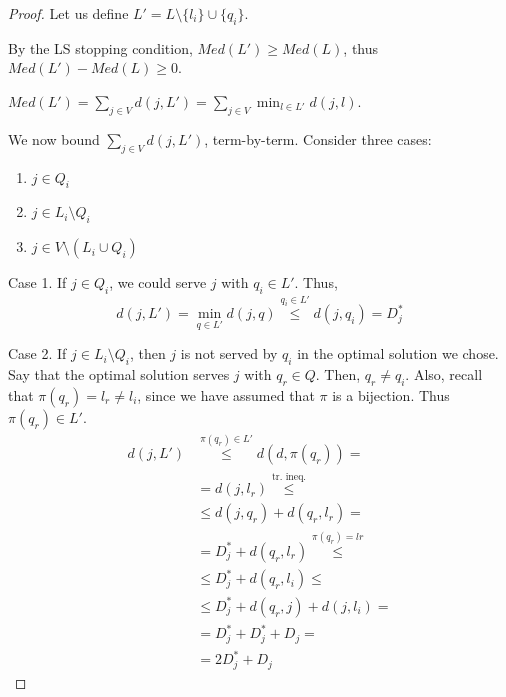     \begin{proof}
        Let us define $L' = L \setminus \{l_i\} \cup \{q_i\}$.

        By the LS stopping condition, $Med(L') \geq Med(L)$, thus $Med(L') - Med(L) \geq 0$.

        $Med(L') = \sum_{j \in V} d(j,L') = \sum_{j \in V} \min_{l \in L'} d(j,l)$.

        We now bound $\sum_{j \in V} d(j,L')$, term-by-term.
        Consider three cases:
        \begin{enumerate}
            \item $j \in Q_i$
            \item $j \in L_i \setminus Q_i$
            \item $j \in V \setminus (L_i \cup Q_i)$
        \end{enumerate}

        Case 1. If $j \in Q_i$, we could serve $j$ with $q_i \in L'$. Thus,
        \begin{equation*}
            d(j,L') = \min_{q \in L'} d(j,q) \overset{q_i \in L'}{\leq} d(j,q_i) = D_j^*
        \end{equation*}

        Case 2. If $j \in L_i \setminus Q_i$, then $j$ is not served by $q_i$ in the optimal solution we chose.
        Say that the optimal solution serves $j$ with $q_r \in Q$.
        Then, $q_r \neq q_i$. Also, recall that $\pi(q_r) = l_r \neq l_i$, since we have assumed that $\pi$ is a bijection. Thus $\pi(q_r) \in L'$.
        \begin{equation*}
            \begin{split}
                d(j,L') &\overset{\pi(q_r)\in L'}{\leq} d(d, \pi(q_r)) =\\
                    &= d(j,l_r) \overset{\text{tr. ineq.}}{\leq}\\
                    &\leq d(j,q_r) + d(q_r, l_r) =\\
                    &= D_j^* + d(q_r, l_r) \overset{\pi(q_r) = lr}{\leq}\\
                    &\leq D_j^* + d(q_r, l_i) \leq\\
                    &\leq D_j^* + d(q_r, j) + d(j, l_i) =\\
                    &= D_j^* + D_j^* + D_j =\\
                    &= 2D_j^* + D_j
            \end{split}
        \end{equation*}


\end{proof}
